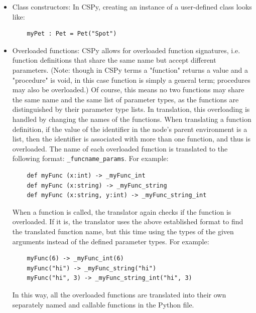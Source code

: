 \documentclass{article}
\begin{document}
\begin{itemize}
\item Class constructors: In CSPy, creating an instance of a user-defined class looks like:
\begin{verbatim}
    myPet : Pet = Pet("Spot")
\end{verbatim}
\item Overloaded functions: CSPy allows for overloaded function signatures, i.e. function definitions that share the same name but accept different parameters. (Note: though in CSPy terms a "function" returns a value and a "procedure" is void, in this case function is simply a general term; procedures may also be overloaded.) Of course, this means no two functions may share the same name and the same list of parameter types, as the functions are distinguished by their parameter type lists. In translation, this overloading is handled by changing the names of the functions. When translating a function definition, if the value of the identifier in the node's parent environment is a list, then the identifier is associated with more than one function, and thus is overloaded. The name of each overloaded function is translated to the following format:
\verb|_funcname_params|. For example:
\begin{verbatim}
    def myFunc (x:int) -> _myFunc_int
    def myFunc (x:string) -> _myFunc_string
    def myFunc (x:string, y:int) -> _myFunc_string_int
\end{verbatim}
When a function is called, the translator again checks if the function is overloaded. If it is, the translator uses the above established format to find the translated function name, but this time using the types of the given arguments instead of the defined parameter types. For example:
\begin{verbatim}
    myFunc(6) -> _myFunc_int(6)
    myFunc("hi") -> _myFunc_string("hi")
    myFunc("hi", 3) -> _myFunc_string_int("hi", 3)
\end{verbatim}
In this way, all the overloaded functions are translated into their own separately named and callable functions in the Python file.


\end{itemize}
\end{document}
